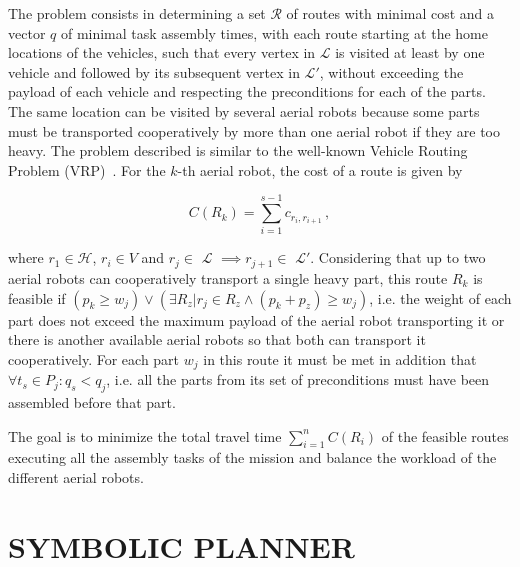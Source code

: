 \documentclass[letterpaper, 10 pt, conference]{ieeeconf}  %
\begin{document}
The problem consists in determining a set $\mathcal{R}$ of routes with minimal cost and a vector $q$ of minimal task assembly times, with each route starting at the home locations of the vehicles, such that every vertex in $\mathcal{L}$ is visited at least by one vehicle and followed by its subsequent vertex in $\mathcal{L'}$, without exceeding the payload of each vehicle and respecting the preconditions for each of the parts. The same location can be visited by several aerial robots because some parts must be transported cooperatively by more than one aerial robot if they are too heavy. The problem described is similar to the well-known Vehicle Routing Problem (VRP)~\cite{Dantzig_Ramser_VRP}.	
	For the $k$-th aerial robot, the cost of a route is given by 

 \begin{equation}
 	{C(R_{k}) = \sum_{i=1}^{s-1} c_{r_i,r_{i+1}}} \, ,
 	\label{eq:route_cost}
 \end{equation}	

\noindent where ${r_1 \in \mathcal{H}}$, ${r_i \in V}$ and ${r_j \in}$ $\mathcal{L}$ ${\implies r_{j+1} \in}$ $\mathcal{L'}$. Considering that up to two aerial robots can cooperatively transport a single heavy part, this route ${R_{k}}$ is feasible if ${(p_k \geq w_j) \lor (\exists R_{z} | r_j \in R_{z} \land (p_k+p_z) \geq w_j)}$, i.e. the weight of each part does not exceed the maximum payload of the aerial robot transporting it or there is another available aerial robots so that both can transport it cooperatively. For each part $w_j$ in this route it must be met in addition that $\forall t_{s} \in P_{j}: q_{s}<q_{j}$, i.e. all the parts from its set of preconditions must have been assembled before that part.
	
The goal is to minimize the total travel time $\sum_{i=1}^{n} C(R_{i})$ of the feasible routes executing all the assembly tasks of the mission and balance the workload of the different aerial robots.

\section{SYMBOLIC PLANNER}
	\label{sec:assembly_symbolic}
\end{document}
